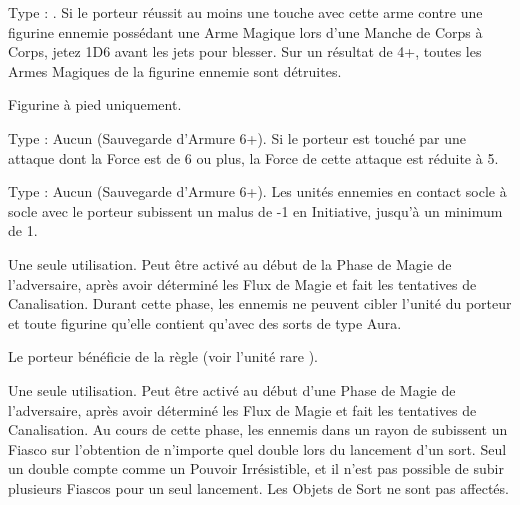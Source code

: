 Type : \ironfist{}. Si le porteur réussit au moins une touche avec cette arme contre une figurine ennemie possédant une Arme Magique lors d'une Manche de Corps à Corps, jetez 1D6 avant les jets pour blesser. Sur un résultat de 4+, toutes les Armes Magiques de la figurine ennemie sont détruites.

\endpricelist

\armymagicalarmour

\startpricelist

Figurine à pied uniquement.

Type : Aucun (Sauvegarde d'Armure 6+). Si le porteur est touché par une attaque dont la Force est de 6 ou plus, la Force de cette attaque est réduite à 5.

Type : Aucun (Sauvegarde d'Armure 6+). Les unités ennemies en contact socle à socle avec le porteur subissent un malus de -1 en Initiative, jusqu'à un minimum de 1.

\endpricelist

\armytalismans

\startpricelist

Une seule utilisation. Peut être activé au début de la Phase de Magie de l'adversaire, après avoir déterminé les Flux de Magie et fait les tentatives de Canalisation. Durant cette phase, les \wizards{} ennemis ne peuvent cibler l'unité du porteur et toute figurine qu'elle contient qu'avec des sorts de type Aura.

\endpricelist

\armyenchanteditems

\startpricelist

Le porteur bénéficie de la règle \stoneskin{} (voir l'unité rare \rockaurochs{}).

\endpricelist

\armyarcaneitems

\startpricelist

Une seule utilisation. Peut être activé au début d'une Phase de Magie de l'adversaire, après avoir déterminé les Flux de Magie et fait les tentatives de Canalisation. Au cours de cette phase, les \wizards{} ennemis dans un rayon de  subissent un Fiasco sur l'obtention de n'importe quel double lors du lancement d'un sort. Seul un double  compte comme un Pouvoir Irrésistible, et il n'est pas possible de subir plusieurs Fiascos pour un seul lancement. Les Objets de Sort ne sont pas affectés.


